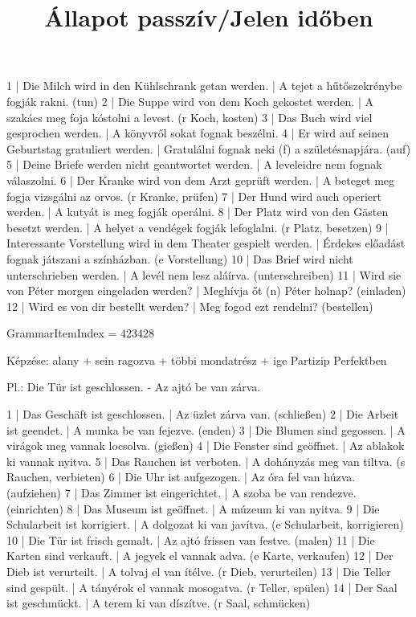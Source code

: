 \begin{exmp}
1 | Die Milch wird in den Kühlschrank getan werden. | A tejet a hűtőszekrénybe fogják rakni. (tun)
2 | Die Suppe wird von dem Koch gekostet werden. | A szakács meg foja kóstolni a levest. (r Koch, kosten)
3 | Das Buch wird viel gesprochen werden. | A könyvről sokat fognak beszélni.
4 | Er wird auf seinen Geburtstag gratuliert werden. | Gratulálni fognak neki (f) a születésnapjára. (auf)
5 | Deine Briefe werden nicht geantwortet werden. | A leveleidre nem fognak válaszolni.
6 | Der Kranke wird von dem Arzt geprüft werden. | A beteget meg fogja vizsgálni az orvos. (r Kranke, prüfen)
7 | Der Hund wird auch operiert werden. | A kutyát is meg fogják operálni.
8 | Der Platz wird von den Gästen besetzt werden. | A helyet a vendégek fogják lefoglalni. (r Platz, besetzen)
9 | Interessante Vorstellung wird in dem Theater gespielt werden. | Érdekes előadást fognak játszani a színházban. (e Vorstellung)
10 | Das Brief wird nicht unterschrieben werden. | A levél nem lesz aláírva. (unterschreiben)
11 | Wird sie von Péter morgen eingeladen werden? | Meghívja őt (n) Péter holnap? (einladen)
12 | Wird es von dir bestellt werden? | Meg fogod ezt rendelni? (bestellen)
\end{exmp}

\title{Állapot passzív/Jelen időben}

GrammarItemIndex = 423428

\begin{desc}
Képzése:
alany + sein ragozva + többi mondatrész + ige Partizip Perfektben

Pl.: Die Tür ist geschlossen. - Az ajtó be van zárva.
\end{desc}

\begin{exmp}
1 | Das Geschäft ist geschlossen. | Az üzlet zárva van. (schließen)
2 | Die Arbeit ist geendet. | A munka be van fejezve. (enden)
3 | Die Blumen sind gegossen. | A virágok meg vannak locsolva. (gießen)
4 | Die Fenster sind geöffnet. | Az ablakok ki vannak nyitva.
5 | Das Rauchen ist verboten. | A dohányzás meg van tiltva. (s Rauchen, verbieten)
6 | Die Uhr ist aufgezogen. | Az óra fel van húzva. (aufziehen)
7 | Das Zimmer ist eingerichtet. | A szoba be van rendezve. (einrichten) 
8 | Das Museum ist geöffnet. | A múzeum ki van nyitva.
9 | Die Schularbeit ist korrigiert. | A dolgozat ki van javítva. (e Schularbeit, korrigieren)
10 | Die Tür ist frisch gemalt. | Az ajtó frissen van festve. (malen)
11 | Die Karten sind verkauft. | A jegyek el vannak adva. (e Karte, verkaufen)
12 | Der Dieb ist verurteilt. | A tolvaj el van ítélve. (r Dieb, verurteilen)
13 | Die Teller sind gespült. | A tányérok el vannak mosogatva. (r Teller, spülen)
14 | Der Saal ist geschmückt. | A terem ki van díszítve. (r Saal, schmücken)
\end{exmp}

